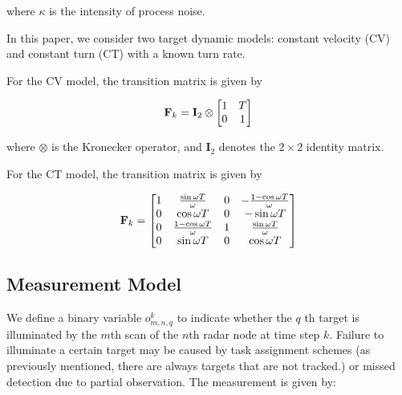 \documentclass[12pt,journal,draftclsnofoot,onecolumn]{IEEEtran}
\begin{document}
where $\kappa$ is the intensity of process noise.

In this paper, we consider two target dynamic models: constant velocity (CV) and constant turn (CT) with a known turn rate.

For the CV model, the transition matrix is given by

\begin{equation}
    {\bf F}_k={\bf I}_{2}\otimes\left[\begin{matrix}1 & T \\ 0 & 1\end{matrix}\right]
\end{equation}

where $\otimes$ is the Kronecker operator, and $\mathbf{I}_2$ denotes the $2\times 2$ identity matrix. 

For the CT model, the transition matrix is given by

\begin{equation}
	{\bf F}_k=\left[\begin{matrix}1 & {\sin \omega T \over \omega} & 0 & -{1-\cos \omega T \over \omega} \\ 0 & \cos \omega T & 0 & -\sin \omega T \\ 0 & {1-\cos \omega T \over \omega} & 1 & {\sin \omega T \over \omega} \\ 0 & \sin \omega T & 0 & \cos \omega T\end{matrix}\right]
\end{equation}






\subsection{Measurement Model}
\label{sec:measurement}
We define a binary variable $o_{m,n,q}^k$ to indicate whether the $q$ th target is illuminated by the $m$th scan of the $n$th radar node at time step $k$. Failure to illuminate a certain target may be caused by task assignment schemes (as previously mentioned, there are always targets that are not tracked.) or missed detection due to partial observation. The measurement is given by:
\end{document}
